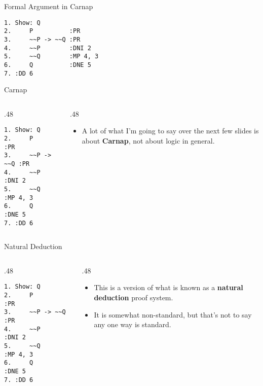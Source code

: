 \documentclass[
  ignorenonframetext,
]{beamer}
\providecommand{\tightlist}{%
  \setlength{\itemsep}{0pt}\setlength{\parskip}{0pt}}
\renewcommand{\,}{\text{, }}
\def\begincols{\begin{columns}}
\def\begincol{\begin{column}}
\def\endcol{\end{column}}
\def\endcols{\end{columns}}
\begin{document}
\begin{frame}[fragile]{Formal Argument in Carnap}
\protect\hypertarget{formal-argument-in-carnap}{}

\begin{verbatim}
1. Show: Q
2.     P          :PR
3.     ~~P -> ~~Q :PR
4.     ~~P        :DNI 2
5.     ~~Q        :MP 4, 3
6.     Q          :DNE 5
7. :DD 6
\end{verbatim}

\end{frame}

\begin{frame}[fragile]{Carnap}
\protect\hypertarget{carnap}{}

\begincols
\begincol{.48\textwidth}

\begin{verbatim}
1. Show: Q
2.     P          :PR
3.     ~~P -> ~~Q :PR
4.     ~~P        :DNI 2
5.     ~~Q        :MP 4, 3
6.     Q          :DNE 5
7. :DD 6
\end{verbatim}

\endcol
\begincol{.48\textwidth}

\begin{itemize}
\tightlist
\item
  A lot of what I'm going to say over the next few slides is about
  \textbf{Carnap}, not about logic in general.
\end{itemize}

\endcol
\endcols

\end{frame}

\begin{frame}[fragile]{Natural Deduction}
\protect\hypertarget{natural-deduction}{}

\begincols
\begincol{.48\textwidth}

\begin{verbatim}
1. Show: Q
2.     P          :PR
3.     ~~P -> ~~Q :PR
4.     ~~P        :DNI 2
5.     ~~Q        :MP 4, 3
6.     Q          :DNE 5
7. :DD 6
\end{verbatim}

\endcol
\begincol{.48\textwidth}

\begin{itemize}
\tightlist
\item
  This is a version of what is known as a \textbf{natural deduction}
  proof system.
\item
  It is somewhat non-standard, but that's not to say any one way is
  standard.
\end{itemize}

\endcol
\endcols

\end{frame}
\end{document}
